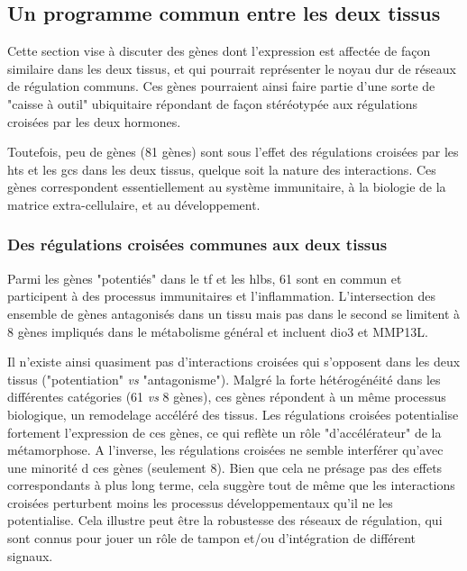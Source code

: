 \documentclass[../main.tex]{subfiles}
\begin{document}
\subsection{Un programme commun entre les deux tissus}
Cette section vise à discuter des gènes dont l'expression est affectée de façon similaire dans les deux tissus, et qui pourrait représenter le noyau dur de réseaux de régulation communs.
Ces gènes pourraient ainsi faire partie d'une sorte de "caisse à outil" ubiquitaire répondant de façon stéréotypée aux régulations croisées par les deux hormones.
\par
Toutefois, peu de gènes (81 gènes) sont sous l'effet des régulations croisées par les \glspl{ht} et les \glspl{gc} dans les deux tissus, quelque soit la nature des interactions.
Ces gènes correspondent essentiellement au système immunitaire, à la biologie de la matrice extra-cellulaire, et au développement.

\subsubsection{Des régulations croisées communes aux deux tissus}
Parmi les gènes "potentiés" dans le \gls{tf} et les \glspl{hlb}, 61 sont en commun et participent à des processus immunitaires et l'inflammation.
L'intersection des ensemble de gènes antagonisés dans un tissu mais pas dans le second se limitent à 8 gènes impliqués dans le métabolisme général et incluent \gls{dio3} et MMP13L.
\par
Il n'existe ainsi quasiment pas d'interactions croisées qui s'opposent dans les deux tissus ("potentiation" \textit{vs} "antagonisme").
Malgré la forte hétérogénéité dans les différentes catégories (61 \textit{vs} 8 gènes), ces gènes répondent à un même processus biologique, un remodelage accéléré des tissus.
Les régulations croisées potentialise fortement l'expression de ces gènes, ce qui reflète un rôle "d'accélérateur" de la métamorphose.
A l'inverse, les régulations croisées ne semble interférer qu'avec une minorité d ces gènes (seulement 8).
Bien que cela ne présage pas des effets correspondants à plus long terme, cela suggère tout de même que les interactions croisées perturbent moins les processus développementaux qu'il ne les potentialise.
Cela illustre peut être la robustesse des réseaux de régulation, qui sont connus pour jouer un rôle de tampon et/ou d'intégration de différent signaux.
\end{document}

